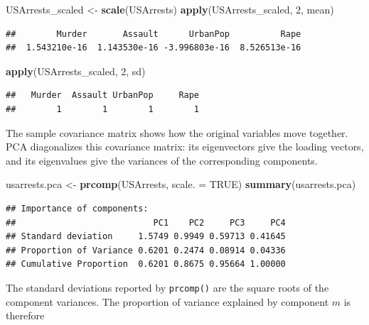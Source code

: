 \documentclass[
  11pt,
]{article}
\newenvironment{Shaded}{\begin{snugshade}}{\end{snugshade}}
\newcommand{\AttributeTok}[1]{\textcolor[rgb]{0.13,0.29,0.53}{#1}}
\newcommand{\ConstantTok}[1]{\textcolor[rgb]{0.56,0.35,0.01}{#1}}
\newcommand{\DecValTok}[1]{\textcolor[rgb]{0.00,0.00,0.81}{#1}}
\newcommand{\FunctionTok}[1]{\textcolor[rgb]{0.13,0.29,0.53}{\textbf{#1}}}
\newcommand{\NormalTok}[1]{#1}
\newcommand{\OtherTok}[1]{\textcolor[rgb]{0.56,0.35,0.01}{#1}}
\begin{document}
\begin{Shaded}
\begin{Highlighting}[]
\NormalTok{USArrests\_scaled }\OtherTok{\textless{}{-}} \FunctionTok{scale}\NormalTok{(USArrests)}
\FunctionTok{apply}\NormalTok{(USArrests\_scaled, }\DecValTok{2}\NormalTok{, mean)}
\end{Highlighting}
\end{Shaded}

\begin{verbatim}
##        Murder       Assault      UrbanPop          Rape 
##  1.543210e-16  1.143530e-16 -3.996803e-16  8.526513e-16
\end{verbatim}

\begin{Shaded}
\begin{Highlighting}[]
\FunctionTok{apply}\NormalTok{(USArrests\_scaled, }\DecValTok{2}\NormalTok{, sd)}
\end{Highlighting}
\end{Shaded}

\begin{verbatim}
##   Murder  Assault UrbanPop     Rape 
##        1        1        1        1
\end{verbatim}

The sample covariance matrix shows how the original variables move
together. PCA diagonalizes this covariance matrix: its eigenvectors give
the loading vectors, and its eigenvalues give the variances of the
corresponding components.

\begin{Shaded}
\begin{Highlighting}[]
\NormalTok{usarrests.pca }\OtherTok{\textless{}{-}} \FunctionTok{prcomp}\NormalTok{(USArrests, }\AttributeTok{scale. =} \ConstantTok{TRUE}\NormalTok{)}
\FunctionTok{summary}\NormalTok{(usarrests.pca)}
\end{Highlighting}
\end{Shaded}

\begin{verbatim}
## Importance of components:
##                           PC1    PC2     PC3     PC4
## Standard deviation     1.5749 0.9949 0.59713 0.41645
## Proportion of Variance 0.6201 0.2474 0.08914 0.04336
## Cumulative Proportion  0.6201 0.8675 0.95664 1.00000
\end{verbatim}

The standard deviations reported by \texttt{prcomp()} are the square
roots of the component variances. The proportion of variance explained
by component \(m\) is therefore
\end{document}
